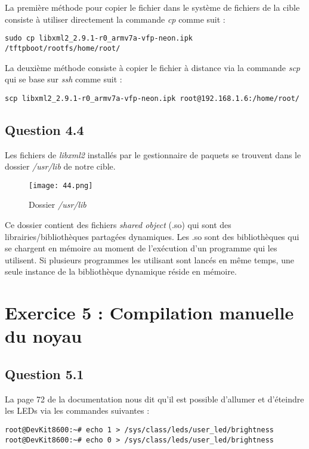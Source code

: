 \documentclass[a4paper,12pt]{report}
\begin{document}
La première méthode pour copier le fichier dans le système de fichiers de la cible consiste à utiliser directement la commande \textit{cp} comme suit : 
\begin{verbatim}
sudo cp libxml2_2.9.1-r0_armv7a-vfp-neon.ipk /tftpboot/rootfs/home/root/
\end{verbatim}

La deuxième méthode consiste à copier le fichier à distance via la commande \textit{scp} qui se base sur \textit{ssh} comme suit : 
\begin{verbatim}
scp libxml2_2.9.1-r0_armv7a-vfp-neon.ipk root@192.168.1.6:/home/root/
\end{verbatim}

\subsection{Question 4.4}

Les fichiers de \textit{libxml2} installés par le gestionnaire de paquets se trouvent dans le dossier \textit{/usr/lib} de notre cible.

\begin{figure}[h]
	\centering
		\texttt{[image: 44.png]}
		\caption{Dossier \textit{/usr/lib}}
\end{figure}

Ce dossier contient des fichiers \textit{shared object} (.so) qui sont des librairies/bibliothèques partagées dynamiques.
Les .so sont des bibliothèques qui se chargent en mémoire au moment de l'exécution d'un programme qui les utilisent. Si plusieurs programmes les utilisant sont lancés en même temps, une seule instance de la bibliothèque dynamique réside en mémoire.
\newpage

\section{Exercice 5 : Compilation manuelle du noyau}
\subsection{Question 5.1}

La page 72 de la documentation nous dit qu'il est possible d'allumer et d'éteindre les LEDs via les commandes suivantes :
\begin{verbatim}
root@DevKit8600:~# echo 1 > /sys/class/leds/user_led/brightness
root@DevKit8600:~# echo 0 > /sys/class/leds/user_led/brightness
\end{verbatim}
\end{document}

